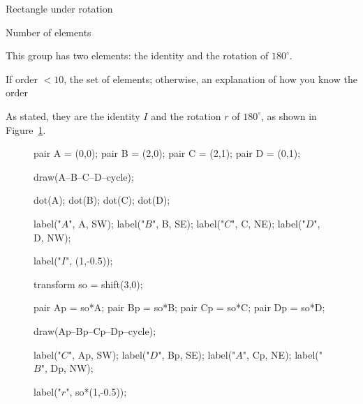 \documentclass[../key.tex]{subfiles}
\begin{document}
\begin{outer_problem}
\item Rectangle under rotation
\end{outer_problem}

\begin{inner_problem}[start=1]
\item Number of elements
\end{inner_problem}

\noindent This group has two elements: the identity and the rotation of $180^\circ$.

\begin{inner_problem}
\item If order $< 10$, the set of elements; otherwise, an explanation of how you know the order
\end{inner_problem}

\noindent As stated, they are the identity $I$ and the rotation $r$ of $180^\circ$, as shown in Figure~\ref{fig:rect_rot}.

\begin{figure}[h]
	\begin{center}
		\begin{minipage}[b]{\textwidth}
			\centering
			\begin{asy}[width=0.5\textwidth]
			pair A = (0,0);
			pair B = (2,0);
			pair C = (2,1);
			pair D = (0,1);
			
			draw(A--B--C--D--cycle);
			
			dot(A);
			dot(B);
			dot(C);
			dot(D);
			
			label("$A$", A, SW);
			label("$B$", B, SE);
			label("$C$", C, NE);
			label("$D$", D, NW);
			
			label("$I$", (1,-0.5));
			
			transform so = shift(3,0);
			
			pair Ap = so*A;
			pair Bp = so*B;
			pair Cp = so*C;
			pair Dp = so*D;
			
			draw(Ap--Bp--Cp--Dp--cycle);
			
			label("$C$", Ap, SW);
			label("$D$", Bp, SE);
			label("$A$", Cp, NE);
			label("$B$", Dp, NW);
			
			label("$r$", so*(1,-0.5));
			\end{asy}
		\end{minipage}
	\end{center}
	\vspace*{-2\baselineskip}
	\begin{center}
		\begin{minipage}[t]{\textwidth}
			\label{fig:rect_rot}
		\end{minipage}
	\end{center}
	\vspace*{-2\baselineskip}
\end{figure}
\end{document}
